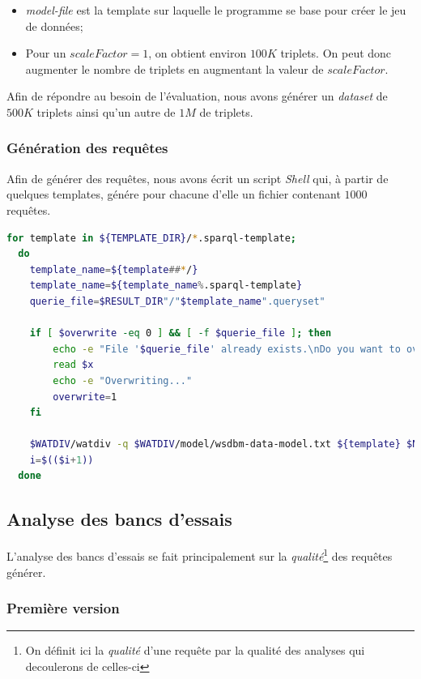 \documentclass[12pt,titlepage]{article}
\begin{document}
\begin{itemize}
  \item \textit{model-file} est la template sur laquelle le programme se base pour créer le jeu de données;
  \item Pour un $scaleFactor = 1$, on obtient environ $100K$ triplets. On peut donc augmenter le nombre de triplets en augmentant la valeur de $scaleFactor$.
\end{itemize}

Afin de répondre au besoin de l'évaluation, nous avons générer un \textit{dataset} de $500K$ triplets ainsi qu'un autre de $1M$ de triplets.

\subsubsection{Génération des requêtes}

Afin de générer des requêtes, nous avons écrit un script \textit{Shell} qui, à partir de quelques templates, génére pour chacune d'elle un fichier contenant $1000$ requêtes.

\begin{lstlisting}[language=bash, caption="Extrait du script qui génére les requêtes]
  for template in ${TEMPLATE_DIR}/*.sparql-template;
  do 
    template_name=${template##*/}
    template_name=${template_name%.sparql-template}
    querie_file=$RESULT_DIR"/"$template_name".queryset"

    if [ $overwrite -eq 0 ] && [ -f $querie_file ]; then
        echo -e "File '$querie_file' already exists.\nDo you want to overwrite ? (any key to continue / CTRL-C to exit)"
        read $x
        echo -e "Overwriting..."
        overwrite=1
    fi

    $WATDIV/watdiv -q $WATDIV/model/wsdbm-data-model.txt ${template} $NB_QUERIES 1 > $querie_file
    i=$(($i+1))
  done
\end{lstlisting}

\subsection{Analyse des bancs d’essais}

L'analyse des bancs d'essais se fait principalement sur la \textit{qualité}\footnote{On définit ici la \textit{qualité} d'une requête par la qualité des analyses qui decoulerons de celles-ci} des requêtes générer.

\subsubsection{Première version}
\end{document}
